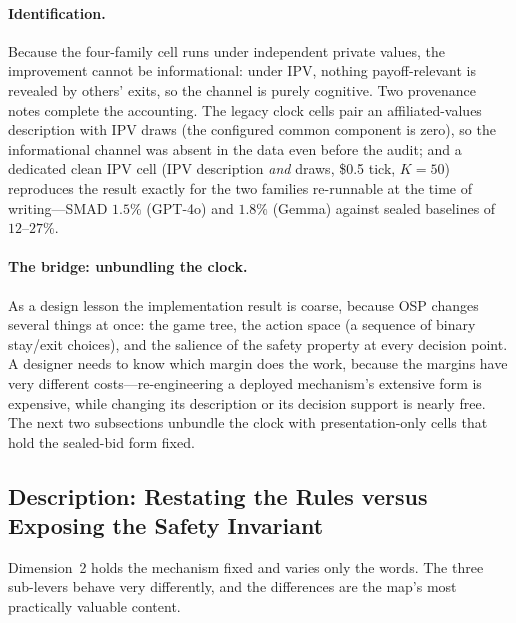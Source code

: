 \paragraph{Identification.}
Because the four-family cell runs under independent private values, the improvement cannot be informational: under IPV, nothing payoff-relevant is revealed by others' exits, so the channel is purely cognitive. Two provenance notes complete the accounting. The legacy clock cells pair an affiliated-values description with IPV draws (the configured common component is zero), so the informational channel was absent in the data even before the audit; and a dedicated clean IPV cell (IPV description \emph{and} draws, \$0.5 tick, $K=50$) reproduces the result exactly for the two families re-runnable at the time of writing---SMAD $1.5\%$ (GPT-4o) and $1.8\%$ (Gemma) against sealed baselines of $12$--$27\%$. 

\paragraph{The bridge: unbundling the clock.}
As a design lesson the implementation result is coarse, because OSP changes several things at once: the game tree, the action space (a sequence of binary stay/exit choices), and the salience of the safety property at every decision point. A designer needs to know which margin does the work, because the margins have very different costs---re-engineering a deployed mechanism's extensive form is expensive, while changing its description or its decision support is nearly free. The next two subsections unbundle the clock with presentation-only cells that hold the sealed-bid form fixed.

\subsection{Description: Restating the Rules versus Exposing the Safety Invariant}\label{sec:map-descriptions}

Dimension~2 holds the mechanism fixed and varies only the words. The three sub-levers behave very differently, and the differences are the map's most practically valuable content.

